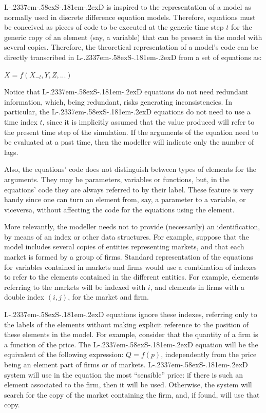 \documentclass [11pt,a4paper] {book}
\def\LsD{{L\kern-.2337em\lower-.58ex\hbox{S}\kern-.181em\lower-.2ex\hbox{D}}\xspace}
\begin{document}
\LsD is inspired to the representation of a model as normally used in discrete difference equation models. Therefore, equations must be conceived as pieces of code to be executed at the generic time step $t$ for the generic copy of an element (say, a variable) that can be present in the model with several copies. Therefore, the theoretical representation of a model's code can be directly transcribed in \LsD from a set of equations as:

$X=f(X_{-l}, Y, Z, ...)$

Notice that \LsD equations do not need redundant information, which, being redundant, risks generating inconsistencies. In particular, the \LsD equations do not need to use a time index $t$, since it is implicitly assumed that the value produced will refer to the present time step of the simulation. If the arguments of the equation need to be evaluated at a past time, then the modeller will indicate only the number of lags.

Also, the equations' code does not distinguish between types of elements for the arguments. They may be parameters, variables or functions, but, in the equations' code they are always referred to by their label. These feature is very handy since one can turn an element from, say, a parameter to a variable, or viceversa, without affecting the code for the equations using the element.


More relevantly, the modeller needs not to provide (necessarily) an identification, by means of an index or other data structures. For example, suppose that the model includes several copies of entities representing markets, and that each market is formed by a group of firms. Standard representation of the equations for variables contained in markets and firms would use a combination of indexes to refer to the elements contained in the different entities. For example, elements referring to the markets will be indexed with $i$, and elements in firms with a double index $(i,j)$, for the market and firm.

\LsD equations ignore these indexes, referring only to the labels of the elements without making explicit reference to the position of these elements in the model. For example, consider that the quantity of a firm is a function of the price. The \LsD equation will be the equivalent of the following expression: $Q=f(p)$, independently from the price being an element part of firms or of markets. \LsD system will use in the equation the most ``sensible'' price: if there is such an element associated to the firm, then it will be used. Otherwise, the system will search for the copy of the market containing the firm, and, if found, will use that copy.
\end{document}
